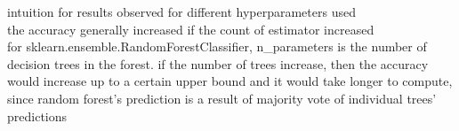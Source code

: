 \documentclass[12pt, border = 4pt, multi]{article} %
\begin{document}
intuition for results observed for different hyperparameters used\\
the accuracy generally increased if the count of estimator increased\\
for sklearn.ensemble.RandomForestClassifier, n\_parameters is the number of decision trees in the forest. if the number of trees increase, then the accuracy would increase up to a certain upper bound and it would take longer to compute, since random forest's prediction is a result of majority vote of individual trees' predictions\\
\end{document}
